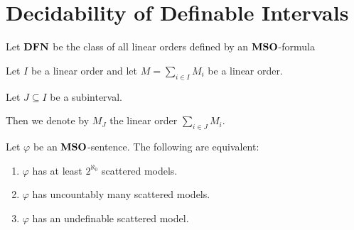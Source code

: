\section{Decidability of Definable Intervals}

\begin{definition}
    Let $\mathbf{DFN}$ be the class of all linear orders defined
    by an $\mathbf{MSO}$-formula
\end{definition}

\begin{notation}
    Let $I$ be a linear order and let $M = \sum_{i \in I} M_i$ be a linear order.

    Let $J \subseteq I$ be a subinterval.

    Then we denote by $M_J$ the linear order
    $\sum_{i \in J} M_i$.
\end{notation}


\begin{theorem}\label{undefinable-scattered-models}
    Let $\varphi$ be an $\mathbf{MSO}$-sentence. The following are equivalent:
    \begin{enumerate}
        \item $\varphi$ has at least $2^{\aleph_0}$ scattered models.
        \item $\varphi$ has uncountably many scattered models.
        \item $\varphi$ has an undefinable scattered model.
    \end{enumerate}
\end{theorem}


